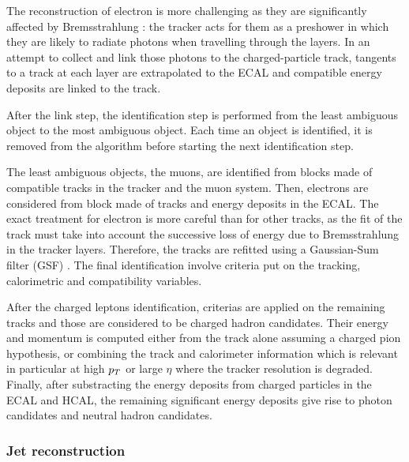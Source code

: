         The reconstruction of electron is more challenging as they are significantly
        affected by Bremsstrahlung : the tracker acts for them as a preshower in which
        they are likely to radiate photons when travelling through the layers.
        In an attempt to collect and link those photons to the charged-particle track,
        tangents to a track at each layer are extrapolated to the ECAL and compatible
        energy deposits are linked to the track.

        After the link step, the identification step is performed from the least ambiguous
        object to the most ambiguous object. Each time an object is identified, it is
        removed from the algorithm before starting the next identification step.

        The least ambiguous objects, the muons, are identified from blocks made of compatible
        tracks in the tracker and the muon system. Then, electrons are considered from
        block made of tracks and energy deposits in the ECAL. The exact treatment for
        electron is more careful than for other tracks, as the fit of the track must take
        into account the successive loss of energy due to Bremsstrahlung in the tracker
        layers. Therefore, the tracks are refitted using a Gaussian-Sum filter (GSF)
        . The final identification involve criteria put on the tracking,
        calorimetric and compatibility variables.

        After the charged leptons identification, criterias are applied on the remaining
        tracks and those are considered to be charged hadron candidates. Their energy
        and momentum is computed either from the track alone assuming a charged pion
        hypothesis, or combining the track and calorimeter information which is relevant
        in particular at high $p_T$ or large $\eta$ where the tracker resolution is
        degraded. Finally, after substracting the energy deposits from charged particles
        in the ECAL and HCAL, the remaining significant energy deposits give rise to photon
        candidates and neutral hadron candidates.


            \subsubsection{Jet reconstruction}

